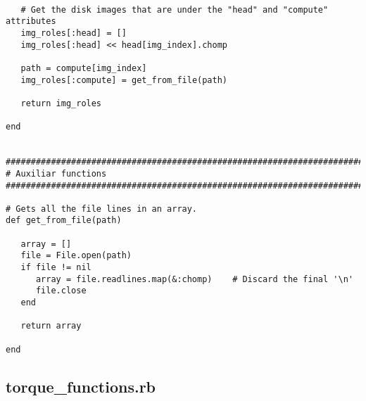 \begin{lstlisting}
   
   # Get the disk images that are under the "head" and "compute" attributes
   img_roles[:head] = []
   img_roles[:head] << head[img_index].chomp
   
   path = compute[img_index]
   img_roles[:compute] = get_from_file(path)
   
   return img_roles
   
end


################################################################################
# Auxiliar functions
################################################################################

# Gets all the file lines in an array.
def get_from_file(path)

   array = []
   file = File.open(path)
   if file != nil
      array = file.readlines.map(&:chomp)    # Discard the final '\n'
      file.close
   end

   return array

end
\end{lstlisting}


\subsection{torque\_functions.rb}


